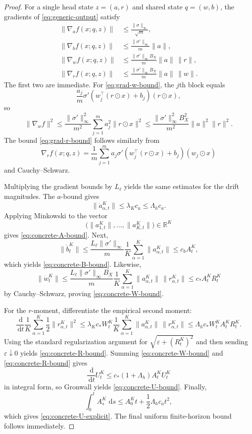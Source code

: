 \documentclass{article}
\theoremstyle{definition}
\newcommand{\R}{\mathbb{R}}
\newcommand{\dd}{\,\mathrm{d}}
\begin{document}
\begin{proof}
For a single head state $z=(a,r)$ and shared state $q=(w,b)$, the gradients of \eqref{eq:generic-output} satisfy
\begin{align}
  \|\nabla_a f(x;q,z)\|
  &\le
  \frac{\|\sigma\|_\infty}{\sqrt m},
  \label{eq:grad-a-bound}
  \\
  \|\nabla_b f(x;q,z)\|
  &\le
  \frac{\|\sigma'\|_\infty}{m}\|a\|,
  \label{eq:grad-b-bound}
  \\
  \|\nabla_w f(x;q,z)\|
  &\le
  \frac{\|\sigma'\|_\infty B_X}{m}\|a\|\,\|r\|,
  \label{eq:grad-w-bound}
  \\
  \|\nabla_r f(x;q,z)\|
  &\le
  \frac{\|\sigma'\|_\infty B_X}{m}\|a\|\,\|w\|.
  \label{eq:grad-r-bound}
\end{align}
The first two are immediate. For \eqref{eq:grad-w-bound}, the $j$th block equals
\[
  \frac{a_j}{m}\sigma'(w_j^\top(r\odot x)+b_j)(r\odot x),
\]
so
\[
  \|\nabla_w f\|^2
  \le
  \frac{\|\sigma'\|_\infty^2}{m^2}
  \sum_{j=1}^m a_j^2 \|r\odot x\|^2
  \le
  \frac{\|\sigma'\|_\infty^2 B_X^2}{m^2}
  \|a\|^2\|r\|^2.
\]
The bound \eqref{eq:grad-r-bound} follows similarly from
\[
  \nabla_r f(x;q,z)
  =
  \frac1m\sum_{j=1}^m
  a_j \sigma'(w_j^\top(r\odot x)+b_j)(w_j\odot x)
\]
and Cauchy--Schwarz.

Multiplying the gradient bounds by $L_\ell$ yields the same estimates for the drift magnitudes. The $a$-bound gives
\[
  \|\dot a_{\alpha,t}^K\|
  \le
  \lambda_K c_a
  \le
  \Lambda_h c_a.
\]
Applying Minkowski to the vector
\[
  \bigl(
    \|a_{1,t}^K\|,\dots,\|a_{K,t}^K\|
  \bigr)\in\R^K
\]
gives \eqref{eq:concrete-A-bound}. Next,
\[
  \| \dot b_t^K \|
  \le
  \frac{L_\ell\|\sigma'\|_\infty}{m}
  \frac1K\sum_{\alpha=1}^K \|a_{\alpha,t}^K\|
  \le
  c_b A_t^K,
\]
which yields \eqref{eq:concrete-B-bound}. Likewise,
\[
  \| \dot w_t^K \|
  \le
  \frac{L_\ell\|\sigma'\|_\infty B_X}{m}
  \frac1K\sum_{\alpha=1}^K
  \|a_{\alpha,t}^K\|\,\|r_{\alpha,t}^K\|
  \le
  c_\ast A_t^K R_t^K
\]
by Cauchy--Schwarz, proving \eqref{eq:concrete-W-bound}.

For the $r$-moment, differentiate the empirical second moment:
\[
  \frac{\dd}{\dd t}\frac1K\sum_{\alpha=1}^K \frac12 \|r_{\alpha,t}^K\|^2
  \le
  \lambda_K c_\ast W_t^K
  \frac1K\sum_{\alpha=1}^K
  \|a_{\alpha,t}^K\|\,\|r_{\alpha,t}^K\|
  \le
  \Lambda_h c_\ast W_t^K A_t^K R_t^K.
\]
Using the standard regularization argument for $\sqrt{\varepsilon+(R_t^K)^2}$ and then sending $\varepsilon\downarrow 0$ yields \eqref{eq:concrete-R-bound}. Summing \eqref{eq:concrete-W-bound} and \eqref{eq:concrete-R-bound} gives
\[
  \frac{\dd}{\dd t}U_t^K
  \le
  c_\ast(1+\Lambda_h)A_t^K U_t^K
\]
in integral form, so Gronwall yields \eqref{eq:concrete-U-bound}. Finally,
\[
  \int_0^t A_s^K\,\dd s
  \le
  A_0^K t + \frac12 \Lambda_h c_a t^2,
\]
which gives \eqref{eq:concrete-U-explicit}. The final uniform finite-horizon bound follows immediately.
\end{proof}
\end{document}
